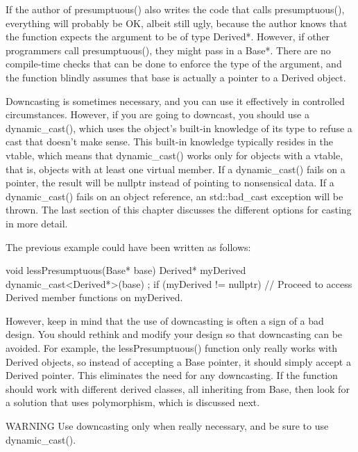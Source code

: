 If the author of presumptuous() also writes the code that calls presumptuous(), everything will probably be OK, albeit still ugly, because the author knows that the function expects the argument to be of type Derived*. However, if other programmers call presumptuous(), they might pass in a Base*. There are no compile-time checks that can be done to enforce the type of the argument, and the function blindly assumes that base is actually a pointer to a Derived object.

Downcasting is sometimes necessary, and you can use it effectively in controlled circumstances. However, if you are going to downcast, you should use a dynamic\_cast(), which uses the object’s built-in knowledge of its type to refuse a cast that doesn’t make sense. This built-in knowledge typically resides in the vtable, which means that dynamic\_cast() works only for objects with a vtable, that is, objects with at least one virtual member. If a dynamic\_cast() fails on a pointer, the result will be nullptr instead of pointing to nonsensical data. If a dynamic\_cast() fails on an object reference, an std::bad\_cast exception will be thrown. The last section of this chapter discusses the different options for casting in more detail.

The previous example could have been written as follows:

\begin{cpp}
void lessPresumptuous(Base* base)
{
    Derived* myDerived { dynamic_cast<Derived*>(base) };
    if (myDerived != nullptr) {
        // Proceed to access Derived member functions on myDerived.
    }
}
\end{cpp}

However, keep in mind that the use of downcasting is often a sign of a bad design. You should rethink and modify your design so that downcasting can be avoided. For example, the lessPresumptuous() function only really works with Derived objects, so instead of accepting a Base pointer, it should simply accept a Derived pointer. This eliminates the need for any downcasting. If the function should work with different derived classes, all inheriting from Base, then look for a solution that uses polymorphism, which is discussed next.

\begin{myWarning}{WARNING}
Use downcasting only when really necessary, and be sure to use dynamic\_cast().
\end{myWarning}






